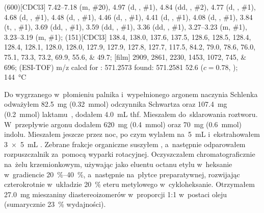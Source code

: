 \begin{fullexp}
	\NMR(600)[CDCl3] \numrange{7.42}{7.18} (m, \#{20}), \num{4.97} (d, , \#{1}), \num{4.84} (dd, , \#{2}), \num{4.77} (d, , \#{1}), \num{4.68} (d, , \#{1}), \num{4.48} (d, , \#{1}), \num{4.46} (d, , \#{1}), \num{4.41} (d, , \#{1}), \num{4.08} (d, , \#{1}), \num{3.84} (t, , \#{1}), \num{3.69} (dd, , \#{1}), \num{3.59} (dd, , \#{1}), \num{3.36} (dd, , \#{1}), \numrange{3.27}{3.23} (m, \#{1}), \numrange{3.23}{3.19} (m, \#{1}); 
	(151)[CDCl3] \numlist{138.4; 138.0; 137.6; 137.5; 128.6; 128.5; 128.4; 128.4; 128.1; 128.0; 128.0; 127.9; 127.9; 127.8; 127.7; 117.5; 84.2; 79.0; 78.6; 76.0; 75.1; 73.3; 73.2; 69.9; 55.6; 49.7}; 
	[film] \numlist{2909; 2861; 2230; 1453; 1072; 745; 696}; 
	 (ESI-TOF) m/z calcd for : \num{571.2573} found: \num{571.2581}
  \data{[$\alpha^{23}_D$]~$=$} \num{52.6} ($c = 0.78$, );
   \SI{144}{\celsius}
\end{fullexp}

Do wygrzanego w~płomieniu palnika i~wypełnionego argonem naczynia Schlenka odważyłem
  \SI{82.5}{\mg} (\SI{0.32}{\mmol}) odczynnika Schwartza oraz \SI{107.4}{\mg} (\SI{0.2}{\mmol})
  laktamu~, dodałem \SI{4.0}{\mL} \gls{thf}.
Mieszałem do~sklarowania roztworu.
W~przepływie argonu dodałem \SI{620}{\mg} (\SI{0.4}{\mmol})  oraz
  \SI{70}{\mg} (\SI{0.6}{\mmol}) indolu.
Mieszałem jeszcze przez noc, po czym wylałem na~\SI{5}{\mL}  i~ekstrahowałem
  \SI[product-units = single]{3 x 5}{\mL} .
Zebrane frakcje organiczne suszyłem , a~następnie odparowałem rozpuszczalnik za~pomocą
  wyparki rotacyjnej.
Oczyszczałem chromatograficznie na~żelu krzemionkowym, używając jako eluentu octanu etylu
  w~heksanie w~gradiencie \SIrange{20}{40}{\percent}, a~następnie na~płytce preparatywnej,
  rozwijając czterokrotnie w~układzie \SI{20}{\percent} eteru 
  metylowego w~cykloheksanie.
Otrzymałem \SI{27.0}{\mg} mieszaniny diastereoizomerów w~proporcji 1:1 w~postaci oleju
  (sumarycznie \SI{23}{\percent} wydajności).

